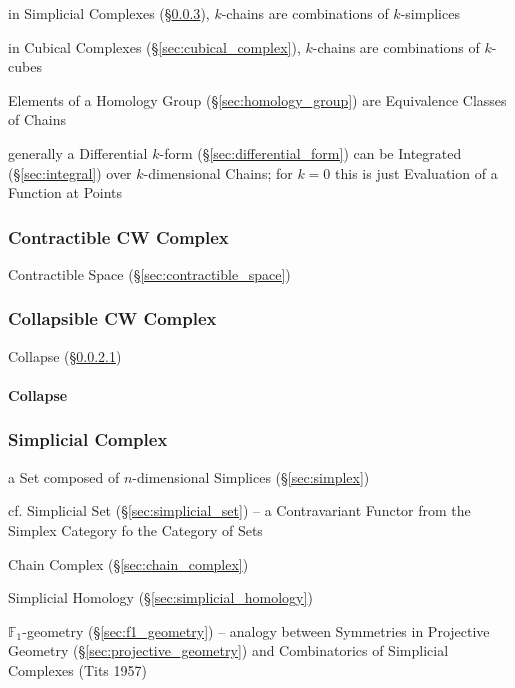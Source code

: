 in Simplicial Complexes (\S\ref{sec:simplicial_complex}), $k$-chains are
combinations of $k$-simplices

in Cubical Complexes (\S\ref{sec:cubical_complex}), $k$-chains are
combinations of $k$-cubes

Elements of a Homology Group (\S\ref{sec:homology_group}) are Equivalence
Classes of Chains

generally a Differential $k$-form (\S\ref{sec:differential_form}) can be
Integrated (\S\ref{sec:integral}) over $k$-dimensional Chains; for $k=0$ this is
just Evaluation of a Function at Points



\subsubsection{Contractible CW Complex}
\label{sec:contractible_cwcomplex}

Contractible Space (\S\ref{sec:contractible_space})



\subsubsection{Collapsible CW Complex}
\label{sec:collapsible_cwcomplex}

Collapse (\S\ref{sec:collapse})



\paragraph{Collapse}\label{sec:collapse}\hfill



\subsubsection{Simplicial Complex}\label{sec:simplicial_complex}

a Set composed of $n$-dimensional Simplices (\S\ref{sec:simplex})

\fist cf. Simplicial Set (\S\ref{sec:simplicial_set}) -- a Contravariant Functor
from the Simplex Category fo the Category of Sets

Chain Complex (\S\ref{sec:chain_complex})

Simplicial Homology (\S\ref{sec:simplicial_homology})

$\mathbb{F}_1$-geometry (\S\ref{sec:f1_geometry}) -- analogy between Symmetries
in Projective Geometry (\S\ref{sec:projective_geometry}) and Combinatorics of
Simplicial Complexes (Tits 1957)


